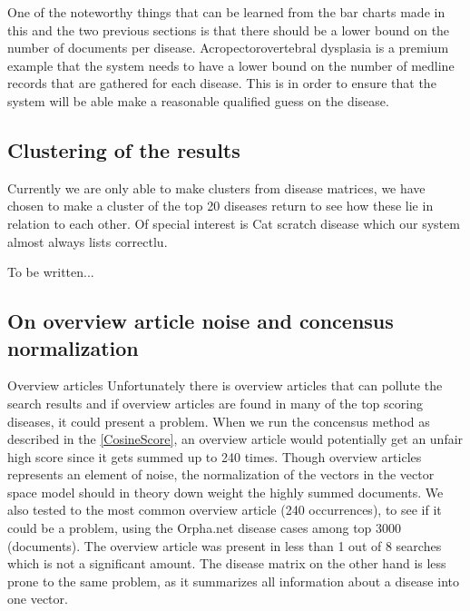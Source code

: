 One of the noteworthy things that can be learned from the bar charts made in this and the two previous sections is that there should be a lower bound on the number of documents per disease. Acropectorovertebral dysplasia is a premium example that the system needs to have a lower bound on the number of medline records that are gathered for each disease. This is in order to ensure that the system will be able make a reasonable qualified guess on the disease.

\subsection{Clustering of the results}
Currently we are only able to make clusters from disease matrices, we have chosen to make a cluster of the top 20 diseases return to see how these lie in relation to each other. Of special interest is Cat scratch disease which our system almost always lists correctlu. %




To be written...




\subsection{On overview article noise and concensus normalization\label{Overview}}

Overview articles
Unfortunately there is overview articles that can pollute the search results and if overview articles are found in many of the top scoring diseases, it could present a problem. When we run the concensus method as described in the \ref{CosineScore}, an overview article would potentially get an unfair high score since it gets summed up to 240 times. Though overview articles represents an element of noise, the normalization of the vectors in the vector space model should in theory down weight the highly summed documents. We also tested to the most common overview article (240 occurrences), to see if it could be a problem, using the Orpha.net disease cases among top 3000 (documents). The overview article was present in less than 1 out of 8 searches which is not a significant amount. The disease matrix on the other hand is less prone to the same problem, as it summarizes all information about a disease into one vector. \\

